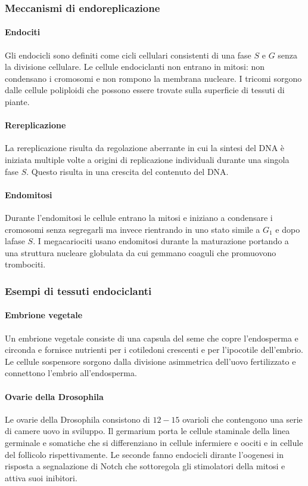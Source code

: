 \subsubsection{Meccanismi di endoreplicazione}
\paragraph{Endociti}
Gli endocicli sono definiti come cicli cellulari consistenti di una fase $S$ e $G$ senza la divisione cellulare. Le cellule endociclanti non entrano in mitosi: non condensano i 
cromosomi e non rompono la membrana nucleare. I tricomi sorgono dalle cellule poliploidi che possono essere trovate sulla superficie di tessuti di piante. 
\paragraph{Rereplicazione}
La rereplicazione risulta da regolazione aberrante in cui la sintesi del DNA \`e iniziata multiple volte a origini di replicazione individuali durante una singola fase $S$. Questo 
risulta in una crescita del contenuto del DNA.
\paragraph{Endomitosi}
Durante l'endomitosi  le cellule entrano la mitosi e iniziano a condensare i cromosomi senza segregarli ma invece rientrando in uno stato simile a $G_1$ e dopo lafase $S$. I 
megacariociti usano endomitosi durante la maturazione portando a una struttura nucleare globulata da cui gemmano coaguli che promuovono trombociti. 
\subsubsection{Esempi di tessuti endociclanti}
\paragraph{Embrione vegetale}
Un embrione vegetale consiste di una capsula del seme che copre l'endosperma e circonda e fornisce nutrienti per i cotiledoni crescenti e per l'ipocotile dell'embrio. Le cellule 
sospensore sorgono dalla divisione asimmetrica dell'uovo fertilizzato e connettono l'embrio all'endosperma.
\paragraph{Ovarie della Drosophila}
Le ovarie della Drosophila consistono di $12-15$ ovarioli che contengono una serie di camere uovo in sviluppo. Il germarium porta le cellule staminale della linea germinale e somatiche 
che si differenziano in cellule infermiere e oociti e in cellule del follicolo rispettivamente. Le seconde fanno endocicli dirante l'oogenesi in risposta a segnalazione di Notch che 
sottoregola gli stimolatori della mitosi e attiva suoi inibitori. 
